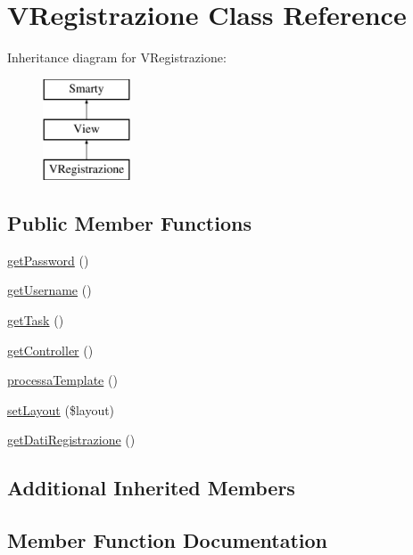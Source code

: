 \hypertarget{class_v_registrazione}{}\section{V\+Registrazione Class Reference}
\label{class_v_registrazione}
Inheritance diagram for V\+Registrazione\+:\begin{figure}[H]
\begin{center}
\leavevmode
\includegraphics[height=3.000000cm]{class_v_registrazione}
\end{center}
\end{figure}
\subsection*{Public Member Functions}
\begin{DoxyCompactItemize}
\item 
\mbox{\hyperlink{class_v_registrazione_a04e0957baeb7acde9c0c86556da2d43f}{get\+Password}} ()
\item 
\mbox{\hyperlink{class_v_registrazione_a81b37a3c9d639574e394f80c1138c75e}{get\+Username}} ()
\item 
\mbox{\hyperlink{class_v_registrazione_a13871c4434338f02d6f8d430fa0597f2}{get\+Task}} ()
\item 
\mbox{\hyperlink{class_v_registrazione_aa8b89e0bad51878addc1300cd3e95b5c}{get\+Controller}} ()
\item 
\mbox{\hyperlink{class_v_registrazione_a64bdc484fc7074989b4b2c0ebc63aec2}{processa\+Template}} ()
\item 
\mbox{\hyperlink{class_v_registrazione_a702b3376618a26e6c02c05bae65c6b9e}{set\+Layout}} (\$layout)
\item 
\mbox{\hyperlink{class_v_registrazione_a41fedff206621545a767261d3566a32d}{get\+Dati\+Registrazione}} ()
\end{DoxyCompactItemize}
\subsection*{Additional Inherited Members}


\subsection{Member Function Documentation}
\mbox{\label{class_v_registrazione_aa8b89e0bad51878addc1300cd3e95b5c}} 

